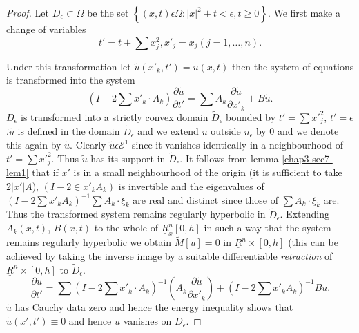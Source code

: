 \begin{proof}
Let $D_\epsilon\subset \Omega$ be the set $\left\{(x, t) \epsilon \Omega: | x|^2
+ t < \epsilon, t \geq 0 \right\}$. We first make a change of variables 
\begin{equation}
t'=t + \sum x^2_j, x'_j=x_j (j=1, \ldots, n). \tag{7.2} \label{chap3-eq7.2}
\end{equation}

Under this transformation let $\tilde{u}(x'_{k}, t') = u(x, t)$ then the
system of equations is transformed into the system 
\begin{equation}
\left(I-2 \sum x'_k \cdot A_k\right)\frac{\partial \tilde{u}}{\partial
  t'} =\sum A_k 
  \frac{ \partial \tilde{u}}{\partial x'_k} + B
  \tilde{u}. \tag{7.3} \label{chap3-eq7.3} 
\end{equation}
$D_\epsilon$ is transformed into a strictly convex domain
$\tilde{D}_\epsilon$ bounded by $t'= \sum x'^2_j$,
$t'=\epsilon$.\pageoriginale $\tilde{u}$ is defined in the domain
$\tilde{D}_\epsilon$ and we extend $\tilde{u}$ outside
$\tilde{u}_\epsilon$ by 0 and we denote this again by
$\tilde{u}$. Clearly $\tilde{u}\epsilon \mathscr{E}^1$ since it
vanishes identically in a neighbourhood of $t'= \sum x'^2_j$. Thus
$\tilde{u}$ has its support in $\tilde{D}_\epsilon$. It follows from
lemma \ref{chap3-sec7-lem1} that if $x'$ is in a small neighbourhood
of the origin (it 
is sufficient to take $2|x'|A$), $(I-2 \in x'_k A_k)$ is
invertible and the eigenvalues of $(I-2 \sum x'_k A_k)^{-1} \sum
A_k \cdot \xi_k$ are real and distinct since those of $\sum A_k \cdot \xi_k$
are. Thus the transformed system remains regularly hyperbolic in
$\tilde{D}_\epsilon$. Extending $A_k(x, t)$, $B(x, t)$ to the whole of
$\underline{R}^n_x[0, h]$ in such a way that the system remains
regularly hyperbolic we obtain $\tilde{M}[u] = 0$ in $\underline{R}^n
\times [0, h]$ (this can be achieved by taking the inverse image by a
suitable differentiable \textit{retraction} of $\underline{R}^n \times
[0, h]$ to $\tilde{D}_\epsilon$. 
\begin{equation}
\frac{\partial \tilde{u}}{\partial t'}= \sum \left(I-2 \sum x'_k \cdot
A_k\right)^{-1} 
\left(A_k \frac{\partial \tilde{u}}{\partial x'_k}\right)+ \left(I-2 \sum x'_k
A_k\right)^{-1}  B\tilde{u}. \tag{7.4} \label{chap3-eq7.4}
\end{equation}
$\tilde{u}$ has Cauchy data zero and hence the energy inequality shows
that $\tilde{u}(x', t')\equiv 0$ and hence $u$ vanishes on
$D_\epsilon$. 
\end{proof}

